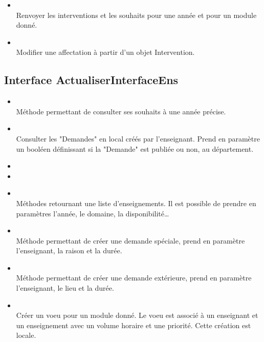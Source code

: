 \begin{itemize}
    	    \item {}\\
    	    Renvoyer les interventions et les souhaits pour une année et pour un module donné.
    	    
    	    \item {}\\
    	    Modifier une affectation à partir d'un objet Intervention.	    
    	    
    	\end{itemize}
	
	\subsection{Interface ActualiserInterfaceEns}
	    \begin{itemize}
	        \item {}\\
	        Méthode permettant de consulter ses souhaits à une année précise.
	        
	        \item {}\\
    	    Consulter les "Demandes" en local créés par l'enseignant. Prend en paramètre un booléen définissant si la "Demande" est publiée ou non, au département.
    	    
    	    \item {}
    	    \item {}
    	    \item {}\\
    	    Méthodes retournant une liste d'enseignements. Il est possible de prendre en paramètres l'année, le domaine, la disponibilité\dots
    	    
    	    \item {}\\
    	    Méthode permettant de créer une demande spéciale, prend en paramètre l'enseignant, la raison et la durée.
    	    
    	    \item {}\\
    	    Méthode permettant de créer une demande extérieure, prend en paramètre l'enseignant, le lieu et la durée.
    	    
    	    \item {}\\
    	    Créer un voeu pour un module donné. Le voeu est associé à un enseignant et un enseignement avec un volume horaire et une priorité. Cette création est locale.

    	\end{itemize}
    	
